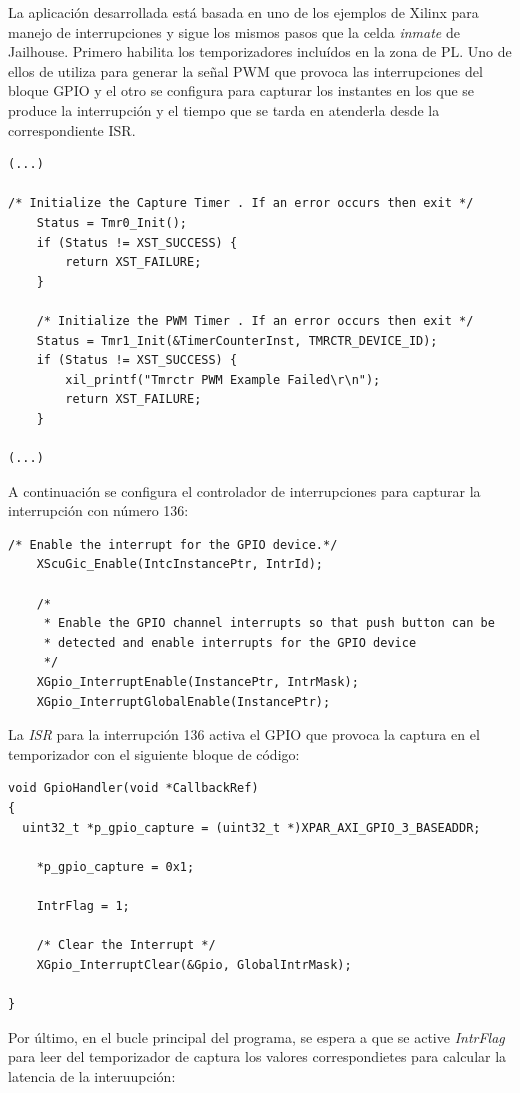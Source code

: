 La aplicación desarrollada está basada en uno de los ejemplos de Xilinx para manejo de interrupciones y sigue los mismos pasos que la celda \textit{inmate} de Jailhouse.
Primero habilita los temporizadores incluídos en la zona de \acrshort{PL}. Uno de ellos de utiliza para generar la señal \acrshort{PWM} que provoca las interrupciones del bloque \acrshort{GPIO} y el otro se configura para capturar los instantes en los que se produce la interrupción y el tiempo que se tarda en atenderla desde la correspondiente \acrshort{ISR}.

\begin{lstlisting}[style=CStyle]
(...)

/* Initialize the Capture Timer . If an error occurs then exit */
	Status = Tmr0_Init();
	if (Status != XST_SUCCESS) {
		return XST_FAILURE;
	}

	/* Initialize the PWM Timer . If an error occurs then exit */
	Status = Tmr1_Init(&TimerCounterInst, TMRCTR_DEVICE_ID);
	if (Status != XST_SUCCESS) {
		xil_printf("Tmrctr PWM Example Failed\r\n");
		return XST_FAILURE;
	}

(...)
\end{lstlisting}

A continuación se configura el controlador de interrupciones para capturar la interrupción con número 136:
\begin{lstlisting}[style=CStyle]
/* Enable the interrupt for the GPIO device.*/
	XScuGic_Enable(IntcInstancePtr, IntrId);

	/*
	 * Enable the GPIO channel interrupts so that push button can be
	 * detected and enable interrupts for the GPIO device
	 */
	XGpio_InterruptEnable(InstancePtr, IntrMask);
	XGpio_InterruptGlobalEnable(InstancePtr);
\end{lstlisting}

La \textit{ISR} para la interrupción 136 activa el \acrshort{GPIO} que provoca la captura en el temporizador con el siguiente bloque de código:
\begin{lstlisting}[style=CStyle]
void GpioHandler(void *CallbackRef)
{
  uint32_t *p_gpio_capture = (uint32_t *)XPAR_AXI_GPIO_3_BASEADDR;

	*p_gpio_capture = 0x1;

	IntrFlag = 1;

	/* Clear the Interrupt */
	XGpio_InterruptClear(&Gpio, GlobalIntrMask);

}
\end{lstlisting}

Por último, en el bucle principal del programa, se espera a que se active \textit{IntrFlag} para leer del temporizador de captura los valores correspondietes para calcular la latencia de la interuupción:

